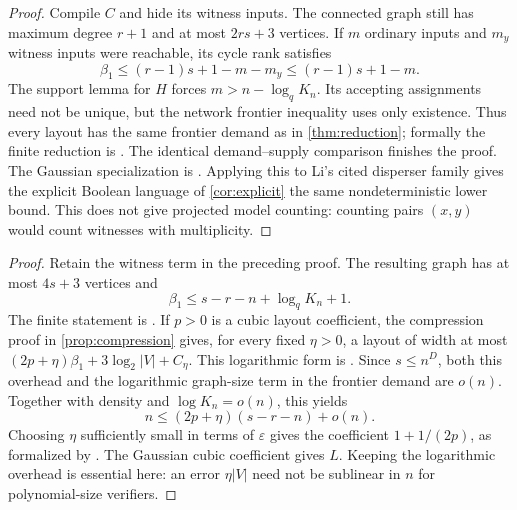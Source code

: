 \documentclass[11pt]{article}
\newcommand{\leanrefs}[1]{{\unskip\nobreak\hfil\penalty50\hskip1em\null\nobreak\hfil
  {\normalfont\small #1}\parfillskip=0pt\finalhyphendemerits=0\par}}
\newcommand{\leanref}[1]{\leanrefs{\lean{#1}}}
\theoremstyle{plain}
\theoremstyle{definition}
\theoremstyle{remark}
\newcommand{\N}{\mathbb{N}}
\newcommand{\card}[1]{\lvert #1\rvert}
\begin{document}
\begin{proof}
Compile $C$ and hide its witness inputs. The connected graph still has maximum degree $r+1$
and at most $2rs+3$ vertices. If $m$ ordinary inputs and $m_y$ witness inputs were reachable,
its cycle rank satisfies
\[
  \beta_1\le(r-1)s+1-m-m_y\le(r-1)s+1-m.
\]
The support lemma for $H$ forces $m>n-\log_q K_n$. Its accepting assignments need not be unique,
but the network frontier inequality uses only existence. Thus every layout has the same
frontier demand as in \cref{thm:reduction}; formally the finite reduction is
.
The identical demand--supply comparison finishes the proof. The Gaussian specialization is
. Applying this to Li's cited disperser
family gives the explicit Boolean language of \cref{cor:explicit} the same nondeterministic
lower bound. This does not give projected model counting: counting pairs $(x,y)$ would
count witnesses with multiplicity.
\end{proof}


\begin{proof}
Retain the witness term in the preceding proof. The resulting graph has at most $4s+3$
vertices and
\[
  \beta_1\le s-r-n+\log_q K_n+1.
\]
The finite statement is .
If $p>0$ is a cubic layout coefficient, the compression proof in \cref{prop:compression}
gives, for every fixed $\eta>0$, a layout of width at most
$(2p+\eta)\beta_1+3\log_2\card V+C_\eta$.
This logarithmic form is .
Since $s\le n^D$, both this overhead and the logarithmic graph-size term in the
frontier demand are $o(n)$. Together with density and $\log K_n=o(n)$, this yields
\[
  n\le(2p+\eta)(s-r-n)+o(n).
\]
Choosing $\eta$ sufficiently small in terms of $\varepsilon$ gives the coefficient
$1+1/(2p)$, as formalized by .
The Gaussian cubic coefficient gives $L$. Keeping the logarithmic overhead is essential
here: an error $\eta\card V$ need not be sublinear in $n$ for polynomial-size verifiers.
\end{proof}
\end{document}
